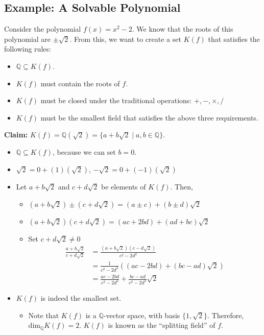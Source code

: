\documentclass[8pt]{extarticle}
\newcommand{\Q}{\mathbb{Q}}
\begin{document}
  \subsection{Example: A Solvable Polynomial}%
  Consider the polynomial $f(x) = x^2 - 2$. We know that the roots of this polynomial are $\pm \sqrt{2}$. From this, we want to create a set $K(f)$ that satisfies the following rules:
  \begin{itemize}
    \item $\Q \subseteq K(f)$.
    \item $K(f)$ must contain the roots of $f$.
    \item $K(f)$ must be closed under the traditional operations: $+,-,\times,/$
    \item $K(f)$ must be the smallest field that satisfies the above three requirements.
  \end{itemize}
  \textbf{Claim:} $K(f) = \Q(\sqrt{2}) = \{a + b\sqrt{2}\mid a,b\in \Q\}$.
  \begin{itemize}
    \item $\Q\subseteq K(f)$, because we can set $b=0$.
    \item $\sqrt{2} = 0 + (1)(\sqrt{2})$, $-\sqrt{2} = 0 + (-1)(\sqrt{2})$
    \item Let $a+b\sqrt{2}$ and $c+d\sqrt{2}$ be elements of $K(f)$. Then,
      \begin{itemize}
        \item $(a+b\sqrt{2})\pm (c+d\sqrt{2}) = (a\pm c) + (b\pm d)\sqrt{2}$
        \item $(a+b\sqrt{2})(c+d\sqrt{2}) = (ac + 2bd) + (ad + bc)\sqrt{2}$
        \item Set $c+d\sqrt{2} \neq 0$
          \begin{align*}
            \frac{a+b\sqrt{2}}{c+d\sqrt{2}} &= \frac{(a+b\sqrt{2})(c-d\sqrt{2})}{c^2-2d^2}\\
                                            &= \frac{1}{c^2-2d^2}\left((ac-2bd) + (bc-ad)\sqrt{2}\right)\\
                                            &= \frac{ac-2bd}{c^2-2d^2} + \frac{bc-ad}{c^2-2d^2}\sqrt{2}
          \end{align*}
      \end{itemize}
    \item $K(f)$ is indeed the smallest set.
      \begin{itemize}
        \item Note that $K(f)$ is a $\Q$-vector space, with basis $\{1,\sqrt{2}\}$. Therefore, $\text{dim}_{\Q} K(f) = 2$. $K(f)$ is known as the ``splitting field'' of $f$.
      \end{itemize}
  \end{itemize}
\end{document}
